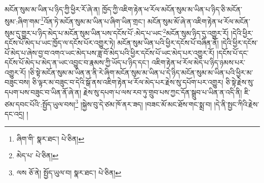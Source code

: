 མངོན་སུམ་མ་ཡིན་པ་ཉིད་ཀྱི་ཕྱིར་རོ་ཞེ་ན། ཁྱོད་ཀྱི་འཇིག་རྟེན་ཕ་རོལ་མངོན་སུམ་མ་ཡིན་པ་ཉིད་ཅི་མངོན་སུམ་:ཞིག་གམ་\footnote{ཞིག་གི་  སྣར་ཐང་།  པེ་ཅིན། }འོན་ཏེ་མངོན་སུམ་མ་ཡིན་པ་ཞིག་ཡིན་གྲང་། མངོན་སུམ་མོ་ཞེ་ན་འཇིག་རྟེན་ཕ་རོལ་མངོན་སུམ་དུ་གྱུར་པ་ཉིད་མེད་པ་མངོན་སུམ་ཡིན་པས་དངོས་པོ་:མེད་པ་ཡང་\footnote{མེད་པ་  པེ་ཅིན། }མངོན་སུམ་ཉིད་དུ་འགྱུར་རོ། །དེའི་ཕྱིར་དངོས་པོ་མེད་པ་ཡང་ཁྱོད་ལ་དངོས་པོར་འགྱུར་ཏེ། མངོན་སུམ་ཡིན་པའི་ཕྱིར་དངོས་པོ་བཞིན་ནོ། །དེའི་ཕྱིར་དངོས་པོ་མེད་པ་ཞེས་བྱ་བ་འགའ་ཡང་མེད་པས་ཟླ་བོ་མེད་པའི་ཕྱིར་དངོས་པོ་ཡང་མེད་པར་འགྱུར་རོ། །དངོས་པོ་དང་དངོས་པོ་མེད་པ་མེད་ན་ཡང་འབྱུང་བ་རྣམས་ཀྱི་ཡོད་པ་ཉིད་དང་། འཇིག་རྟེན་ཕ་རོལ་མེད་པ་ཉིད་ཉམས་པར་འགྱུར་རོ། །ཅི་སྟེ་མངོན་སུམ་མ་ཡིན་ན་ནི་རེ་ཞིག་མངོན་སུམ་མ་ཡིན་པ་དེ་ཉིད་མངོན་སུམ་མ་ཡིན་པའི་ཕྱིར་མ་བཟུང་བས། ཅི་ལྟར་མ་བཟུང་བ་དེའི་སྒོ་ནས་འཇིག་རྟེན་ཕ་རོལ་མེད་པར་རྗེས་སུ་དཔོག་པར་འགྱུར། ཅི་སྟེ་རྗེས་སུ་དཔག་པས་བཟུང་བ་ཡིན་ནོ་ཞེ་ན། རྗེས་སུ་དཔག་པ་ལས་རབ་ཏུ་གྲུབ་པས་ཀྱང་དོན་སྒྲུབ་པ་ཡིན་ན་འདི་ནི། ཇི་ཙམ་དབང་པོའི་:སྤྱོད་ཡུལ་བས།\footnote{ལས  ཅོ་ནེ། སྤྱོད་ཡུལ་བ།  སྣར་ཐང་།  པེ་ཅིན། } །སྐྱེས་བུ་དེ་ཙམ་ཁོ་ནར་ཟད། །བཟང་མོ་མང་ཐོས་གང་སྨྲ་བ། །དེ་ནི་སྤྱང་ཀིའི་རྗེས་དང་འདྲ། །
